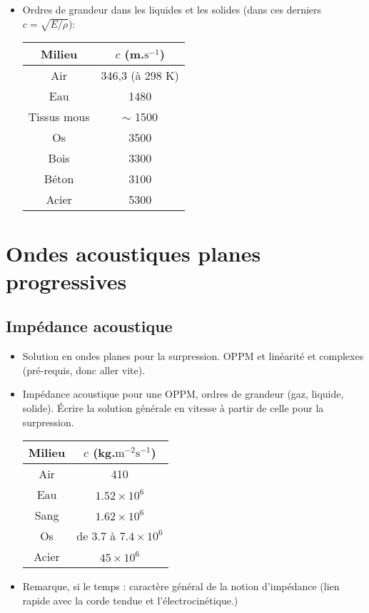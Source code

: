 \documentclass[11pt,a4paper]{report}
\begin{document}
\begin{itemize}
	\item Ordres de grandeur dans les liquides et les solides (dans ces derniers $c = \sqrt{E/\rho}$):\\
	\begin{center}
		\begin{tabular}{|c|c|}
 		\hline
  			Milieu & $c$ (m.$\text{s}^{-1}$)\\
 		\hline
  			Air & 346,3 (à 298 K)\\
  		\hline
  			Eau & 1480 \\
  		\hline
  			Tissus mous & $\sim$ 1500 \\
  		\hline
  			Os & 3500 \\
  		\hline
  			Bois & 3300 \\
  		\hline 
  			Béton & 3100\\
  		\hline
  		  	Acier & 5300\\
  		\hline
		\end{tabular}
	\end{center}
\end{itemize}

\section{Ondes acoustiques planes progressives}\label{sec:2}
\subsection{Impédance acoustique}
\begin{itemize}
	\item Solution en ondes planes pour la surpression. OPPM et linéarité et complexes (pré-requis, donc aller vite). 
	\item Impédance acoustique pour une OPPM, ordres de grandeur (gaz, liquide, solide). Écrire la solution générale en vitesse à partir de celle pour la surpression. 
		\begin{center}
		\begin{tabular}{|c|c|}
 		\hline
  			Milieu & $c$ (kg.$\text{m}^{-2}\text{s}^{-1}$)\\
 		\hline
  			Air & 410 \\
  		\hline
  			Eau & $1.52\times 10^{6}$ \\
  		\hline
  			Sang & $1.62\times 10^{6}$ \\
  		\hline
  			Os & de $3.7$ à $7.4\times 10^{6}$ \\
  		\hline
  		  	Acier & $45\times 10^{6}$\\
  		\hline
		\end{tabular}
	\end{center}
	
	\item Remarque, si le temps : caractère général de la notion d'impédance (lien rapide avec la corde tendue et l'électrocinétique.)
\end{itemize}
\end{document}
